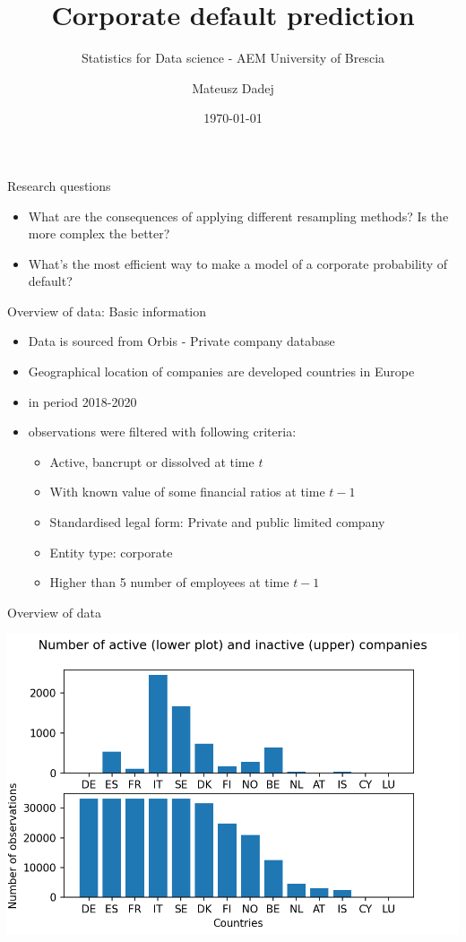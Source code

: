 \documentclass{beamer}
\title{Corporate default prediction}
\subtitle{Statistics for Data science - AEM University of Brescia}
\author{Mateusz Dadej}
\date{\today}
\begin{document}
\begin{frame}
\titlepage
\end{frame}

\begin{frame}{Research questions}
\begin{itemize}
\item What are the consequences of applying different resampling methods? Is the more complex the better?
\item What's the most efficient way to make a model of a corporate probability of default?
\end{itemize}
\end{frame}

\begin{frame}{Overview of data: Basic information}

\begin{itemize}
\item Data is sourced from Orbis - Private company database
\item Geographical location of companies are developed countries in Europe 
\item in period 2018-2020
\item observations were filtered with following criteria:
	\begin{itemize}
	\item Active, bancrupt or dissolved at time $t$
	\item With known value of some financial ratios at time $t-1$
	\item Standardised legal form: Private and public limited company
	\item Entity type: corporate
	\item Higher than 5 number of employees at time $t-1$
	\end{itemize}

\end{itemize}

\end{frame}

\begin{frame}{Overview of data}
\begin{center}
\includegraphics[scale=0.7]{img/country_n.png}
\end{center}
\end{frame}
\end{document}
